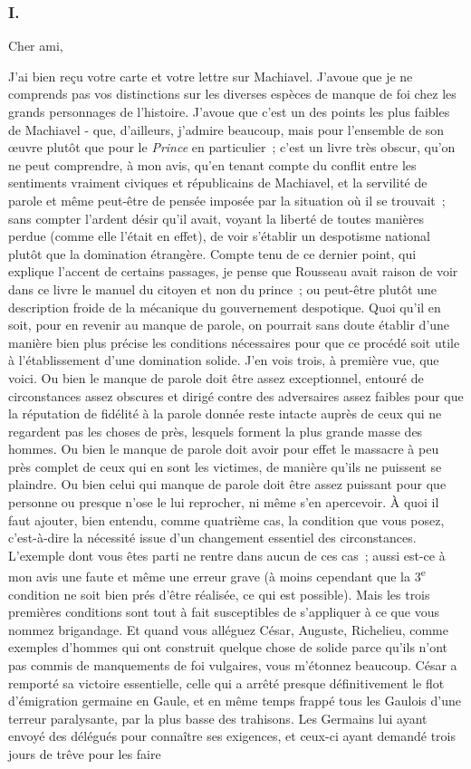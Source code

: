 \documentclass[french,twoside]{book} %
\begin{document}
\subsubsection[I.]{I.}
\noindent Cher ami,\par
J'ai bien reçu votre carte et votre lettre sur Machiavel. J'avoue que je ne comprends pas vos distinctions sur les diverses espèces de manque de foi chez les grands personnages de l'histoire. J'avoue que c'est un des points les plus faibles de Machiavel - que, d'ailleurs, j'admire beaucoup, mais pour l'ensemble de son œuvre plutôt que pour le {\itshape Prince} en particulier ; c'est un livre très obscur, qu'on ne peut comprendre, à mon avis, qu'en tenant compte du conflit entre les sentiments vraiment civiques et républicains de Machiavel, et la servilité de parole et même peut-être de pensée imposée par la situation où il se trouvait ; sans compter l'ardent désir qu'il avait, voyant la liberté de toutes manières perdue (comme elle l'était en effet), de voir s'établir un despotisme national plutôt que la domination étrangère. Compte tenu de ce dernier point, qui explique l'accent de certains passages, je pense que Rousseau avait raison de voir dans ce livre le manuel du citoyen et non du prince ; ou peut-être plutôt une description froide de la mécanique du gouvernement despotique. Quoi qu'il en soit, pour en revenir au manque de parole, on pourrait sans doute établir d'une manière bien plus précise les conditions nécessaires pour que ce procédé soit utile à l'établissement d'une domination solide. J'en vois trois, à première vue, que voici. Ou bien le manque de parole doit être assez exceptionnel, entouré de circonstances assez obscures et dirigé contre des adversaires assez faibles pour que la réputation de fidélité à la parole donnée reste intacte auprès de ceux qui ne regardent pas les choses de près, lesquels forment la plus grande masse des hommes. Ou bien le manque de parole doit avoir pour effet le massacre à peu près complet de ceux qui en sont les victimes, de manière qu'ils ne puissent se plaindre. Ou bien celui qui manque de parole doit être assez puissant pour que personne ou presque n'ose le lui reprocher, ni même s'en apercevoir. À quoi il faut ajouter, bien entendu, comme quatrième cas, la condition que vous posez, c'est-à-dire la nécessité issue d'un changement essentiel des circonstances. L'exemple dont vous êtes parti ne rentre dans aucun de ces cas ; aussi est-ce à mon avis une faute et même une erreur grave (à moins cependant que la 3\textsuperscript{e} condition ne soit bien prés d'être réalisée, ce qui est possible). Mais les trois premières conditions sont tout à fait susceptibles de s'appliquer à ce que vous nommez brigandage. Et quand vous alléguez César, Auguste, Richelieu, comme exemples d'hom­mes qui ont construit quelque chose de solide parce qu'ils n'ont pas commis de manquements de foi vulgaires, vous m'étonnez beaucoup. César a remporté sa victoire essentielle, celle qui a arrêté presque définitivement le flot d'émigra­tion germaine en Gaule, et en même temps frappé tous les Gaulois d'une terreur paralysante, par la plus basse des trahisons. Les Germains lui ayant envoyé des délégués pour connaître ses exigences, et ceux-ci ayant demandé trois jours de trêve pour les faire 
\end{document}
